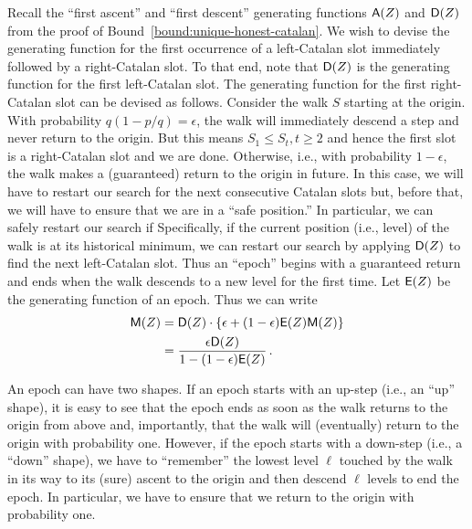   Recall the ``first ascent'' and ``first descent'' 
  generating functions $\mathsf{A}(Z)$ and $\mathsf{D}(Z)$ 
  from the proof of Bound~\ref{bound:unique-honest-catalan}. 
  We wish to devise the generating function for 
  the first occurrence of a left-Catalan slot 
  immediately followed by a right-Catalan slot. 
  To that end, 
  note that $\mathsf{D}(Z)$ is the generating function for 
  the first left-Catalan slot. 
  The generating function for the first right-Catalan slot 
  can be devised as follows. 
  Consider the walk $S$ starting at the origin. 
  With probability $q(1 - p/q) = \epsilon$, the walk will 
  immediately descend a step and never return to the origin. 
  But this means $S_1 \leq S_t, t \geq 2$ and hence 
  the first slot is a right-Catalan slot and we are done. 
  Otherwise, i.e., with probability $1 - \epsilon$, 
  the walk makes a (guaranteed) return to the origin in future. 
  In this case, we will have to restart our search 
  for the next consecutive Catalan slots but, 
  before that, 
  we will have to ensure that we are in a ``safe position.'' 
  In particular, we can safely restart our search if 
  Specifically, if the current position (i.e., level) of the walk is at its historical minimum, 
  we can restart our search by applying $\mathsf{D}(Z)$ to find the next left-Catalan slot.
  Thus an ``epoch'' begins with a guaranteed return and 
  ends when the walk descends to a new level for the first time. 
  Let $\mathsf{E}(Z)$ be the generating function of an epoch. 
  Thus we can write 
  \begin{align}\label{eq:gfM}
    \mathsf{M}(Z) 
    &= \mathsf{D}(Z) \cdot \{\epsilon + (1-\epsilon)\mathsf{E}(Z)\mathsf{M}(Z) \} \nonumber \\
    &= \frac{\epsilon \mathsf{D}(Z)}{1 - (1 - \epsilon) \mathsf{E}(Z) }
    \,.
  \end{align}

  
  An epoch can have two shapes. 
  If an epoch starts with an up-step (i.e., an ``up'' shape), 
  it is easy to see that the epoch ends as soon as the walk 
  returns to the origin from above and, importantly, 
  that the walk will (eventually) return to the origin with probability one. 
  However, if the epoch starts with a down-step (i.e., a ``down'' shape), 
  we have to ``remember'' the lowest level $\ell$ touched 
  by the walk in its way to its (sure) ascent to the origin 
  and then descend $\ell$ levels to end the epoch. 
  In particular, we have to ensure that we return to the origin with probability one. 
  
